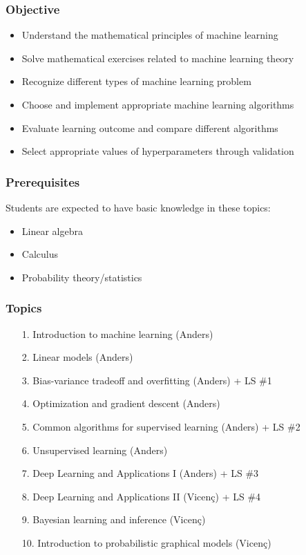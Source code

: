 \documentclass[10pt]{beamer}
\begin{document}
\begin{frame}
  \frametitle{Objective}

  \begin{itemize}
  \item {\color{red} Understand the mathematical principles of machine learning}
  \item Solve mathematical exercises related to machine learning theory
  \item Recognize different types of machine learning problem
  \item Choose and implement appropriate machine learning algorithms
  \item Evaluate learning outcome and compare different algorithms
  \item Select appropriate values of hyperparameters through validation
  \end{itemize}
\end{frame}

\begin{frame}
  \frametitle{Prerequisites}

  Students are expected to have basic knowledge in these topics:
  \begin{itemize}
  \item Linear algebra
  \item Calculus
  \item Probability theory/statistics
  \end{itemize}
\end{frame}

\begin{frame}
  \frametitle{Topics}

  \begin{itemize}
    \item[1.] Introduction to machine learning (Anders)
    \item[2.] Linear models (Anders)
    \item[3.] Bias-variance tradeoff and overfitting (Anders) {\color{red} + LS \#1}
	\item[4.] Optimization and gradient descent (Anders)
	\item[5.] Common algorithms for supervised learning (Anders) {\color{red} + LS \#2}
  	\item[6.] Unsupervised learning (Anders)
    \item[7.] Deep Learning and Applications I (Anders) {\color{red} + LS \#3}
    \item[8.] Deep Learning and Applications II (Vicen\c{c}) {\color{red} + LS \#4}
    \item[9.] Bayesian learning and inference (Vicen\c{c})
    \item[10.] Introduction to probabilistic graphical models (Vicen\c{c})
  \end{itemize}
\end{frame}
\end{document}
